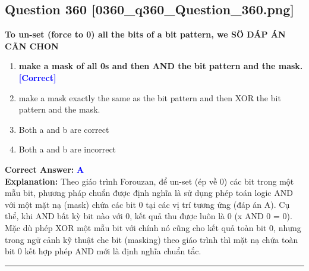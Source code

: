\documentclass[11pt,a4paper]{article}
\begin{document}
\begin{minipage}{\textwidth}
\subsection*{Question 360 \quad \footnotesize{[0360\_q360\_Question\_360.png]}}
\noindent \textbf{To un-set (force to 0) all the bits of a bit pattern, we SÖ DÁP ÁN CÃN CHON}

\begin{enumerate}[label=\Alph*.]
    \item \textbf{make a mask of all 0s and then AND the bit pattern and the mask.} \hfill \textcolor{blue}{\textbf{[Correct]}}
    \item make a mask exactly the same as the bit pattern and then XOR the bit pattern and the mask.
    \item Both a and b are correct
    \item Both a and b are incorrect
\end{enumerate}

\noindent \textbf{Correct Answer:} \textcolor{blue}{\textbf{A}} \\[2pt]
\noindent \textbf{Explanation:} Theo giáo trình Forouzan, để un-set (ép về 0) các bit trong một mẫu bit, phương pháp chuẩn được định nghĩa là sử dụng phép toán logic AND với một mặt nạ (mask) chứa các bit 0 tại các vị trí tương ứng (đáp án A). Cụ thể, khi AND bất kỳ bit nào với 0, kết quả thu được luôn là 0 (x AND 0 = 0). Mặc dù phép XOR một mẫu bit với chính nó cũng cho kết quả toàn bit 0, nhưng trong ngữ cảnh kỹ thuật che bit (masking) theo giáo trình thì mặt nạ chứa toàn bit 0 kết hợp phép AND mới là định nghĩa chuẩn tắc.

\par\vspace{0.3cm}
\hrule
\vspace{0.3cm}
\end{minipage}
\end{document}
